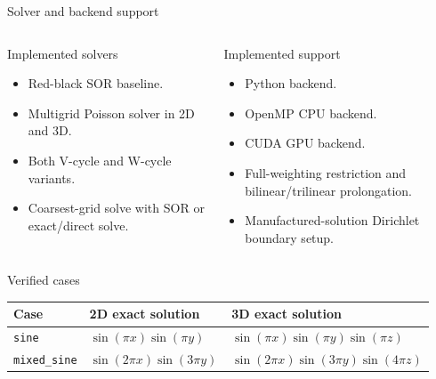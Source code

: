 \documentclass[aspectratio=169]{beamer}
\newcommand{\frametitlesub}[2]{#2}
\begin{document}
\begin{frame}[t]{\frametitlesub{Algorithms and backends}{Solver and backend support}}
    \footnotesize
    \begin{columns}[T,onlytextwidth]
        \begin{block}{Implemented solvers}
            \begin{itemize}
                \item Red-black SOR baseline.
                \item Multigrid Poisson solver in 2D and 3D.
                \item Both V-cycle and W-cycle variants.
                \item Coarsest-grid solve with SOR or exact/direct solve.
            \end{itemize}
        \end{block}

        \begin{block}{Implemented support}
            \begin{itemize}
                \item Python backend.
                \item OpenMP CPU backend.
                \item CUDA GPU backend.
                \item Full-weighting restriction and bilinear/trilinear prolongation.
                \item Manufactured-solution Dirichlet boundary setup.
            \end{itemize}
        \end{block}
    \end{columns}

    \begin{block}{Verified cases}
        \scriptsize
        \setlength{\tabcolsep}{4pt}
        \renewcommand{\arraystretch}{1.2}
        \begin{tabular}{@{}p{0.18\linewidth}p{0.38\linewidth}p{0.38\linewidth}@{}}
            \textbf{Case}        & \textbf{2D exact solution}   & \textbf{3D exact solution}               \\
            \hline
            \texttt{sine}        & \(\sin(\pi x)\sin(\pi y)\)   & \(\sin(\pi x)\sin(\pi y)\sin(\pi z)\)    \\
            \texttt{mixed\_sine} & \(\sin(2\pi x)\sin(3\pi y)\) & \(\sin(2\pi x)\sin(3\pi y)\sin(4\pi z)\) \\
        \end{tabular}
    \end{block}
\end{frame}
\end{document}
